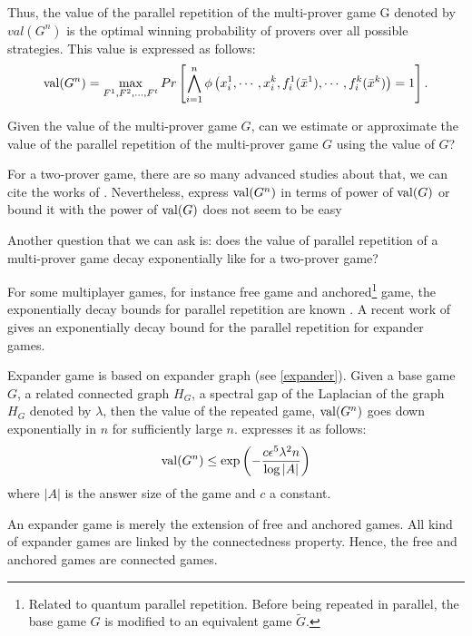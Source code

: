 Thus, the value of the parallel repetition of the multi-prover game G denoted by $val(G^n)$ is the optimal winning probability of provers over all possible strategies. This value is expressed as follows: 
$$ \mathrm{val} (G^n)= \max_{F^1,F^2, \ldots, F^t} Pr \left[  \bigwedge\limits_{i=1}^n \phi \left( x_i^1, \cdots , x_i^k, f_i^1(\bar{x}^1), \cdots ,  f_i^k(\bar{x}^k) \right)=1 \right].$$


Given the value of the multi-prover game $G$, can we estimate or approximate the value of the parallel repetition of the multi-prover game $G$ using the value of $G$? 

For a two-prover game, there are so many advanced studies about that, we can cite the works of \cite{feige1992two, verbitsky1996towards,raz1998parallel, holenstein2007parallel, barak2009strong,raz2010parallel, rao2011parallel,dinur2014analytical}.  Nevertheless, express $\mathrm{val} (G^n)$  in terms of power of $\mathrm{val} (G)$ or bound it with the power of $\mathrm{val} (G)$ does not seem to be easy

 Another question that we can ask is: does the value of parallel repetition of a multi-prover game decay exponentially like for a two-prover game?

For some multiplayer games, for instance free game and anchored\footnote{ Related to quantum parallel repetition. Before being repeated in parallel, the base game $G$ is modified to an equivalent game $\tilde{G}$.} game, the exponentially decay bounds for parallel repetition are known \citep{barak2009strong,bavarian2015anchoring}.  A recent work of \cite{dinur2016multiplayer} gives an exponentially decay bound for the parallel repetition for  expander games. 

Expander game is based on expander graph (see \eqref{expander}).  Given a base game $G$, a related connected graph $H_G$, a spectral gap of the Laplacian
of the graph $H_G$ denoted by $\lambda$,  then the value of the repeated game, $\mathrm{val} (G^n)$  goes down exponentially in $n$ for sufficiently large $n$. \cite{dinur2016multiplayer} expresses it as follows:
\begin{align}
\mathrm{val} (G^n) \leq \exp \left(-\frac{c \epsilon^5 \lambda^2 n }{\log |A|}\right) \label{exp}
\end{align}
where $|A|$ is the answer size of the game and $c$ a constant.

An expander game is  merely the extension of free and anchored games. All kind of expander games are linked by the connectedness property. Hence, the free and anchored games are connected games. 

